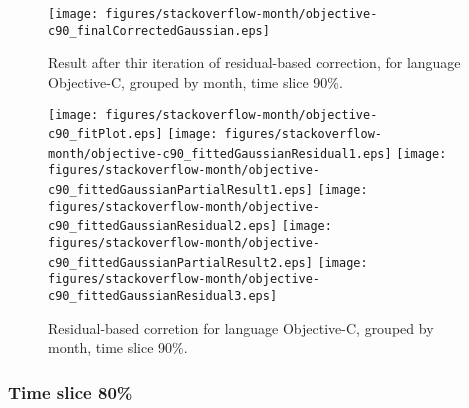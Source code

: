 \begin{figure}[]
\centering
{\texttt{[image: figures/stackoverflow-month/objective-c90\_finalCorrectedGaussian.eps]}}
\caption{Result after thir iteration of residual-based correction, for language Objective-C, grouped by month, time slice 90\%.}
\end{figure}


\begin{figure}[hb]
\centering
{}
{\texttt{[image: figures/stackoverflow-month/objective-c90\_fitPlot.eps]}}
{\texttt{[image: figures/stackoverflow-month/objective-c90\_fittedGaussianResidual1.eps]}}
{\texttt{[image: figures/stackoverflow-month/objective-c90\_fittedGaussianPartialResult1.eps]}}
{\texttt{[image: figures/stackoverflow-month/objective-c90\_fittedGaussianResidual2.eps]}}
{\texttt{[image: figures/stackoverflow-month/objective-c90\_fittedGaussianPartialResult2.eps]}}
{\texttt{[image: figures/stackoverflow-month/objective-c90\_fittedGaussianResidual3.eps]}}
\caption{Residual-based corretion for language Objective-C, grouped by month, time slice 90\%.}
\end{figure}


\clearpage 
\newpage 


\FloatBarrier

\subsubsection{Time slice 80\%}


